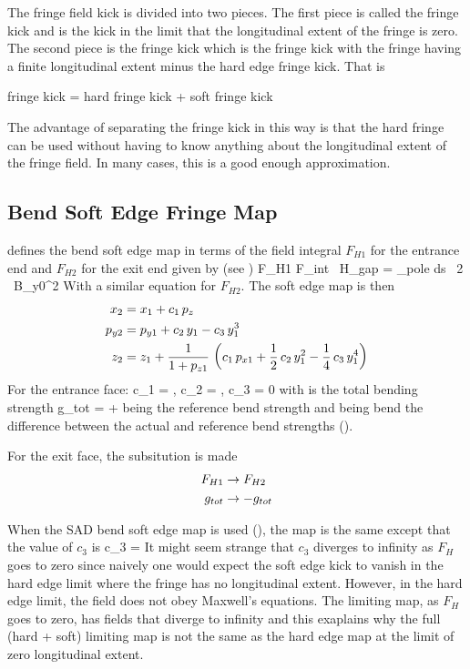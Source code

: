 The fringe field kick is divided into two pieces. 
The first piece is called the  fringe kick and is the kick in the limit
that the longitudinal extent of the fringe is zero. The second piece is the 
 fringe kick which is the fringe kick with the fringe having a finite
longitudinal extent minus the hard edge fringe kick. That is
\begin{example}
  fringe kick = hard fringe kick + soft fringe kick
\end{example}
The advantage of separating the fringe kick in this way is that the hard fringe can
be used without having to know anything about the longitudinal extent of the fringe
field. In many cases, this is a good enough approximation. 

\subsection{Bend Soft Edge Fringe Map}


\bmad defines the bend soft edge map in terms of the field integral
$F_{H1}$ for the entrance end and $F_{H2}$ for the exit end given by
(see )
\Begineq
  F_{H1} \equiv F_{int} \, H_{gap} = \int_{pole} \! \! ds \, 
  {2 \, B_{y0}^2}
\Endeq
With a similar equation for $F_{H2}$.
The soft edge map is then
\begin{align}
  x_2 &=  x_1 + c_1 \, p_z \nonumber \\
  p_{y2} &= p_{y1} + c_2 \, y_1 - c_3 \, y_1^3 \\
  z_2 &= z_1 + \frac{1}{1 + p_{z1}} \, \left( 
    c_1 \, p_{x1} + \frac{1}{2} \, c_2 \, y_1^2 -\frac{1}{4} \, c_3 \, y_1^4 \right)
    \nonumber
\end{align}
For the entrance face:
\Begineq
  c_1 = , \qquad 
  c_2 = , \qquad 
  c_3 = 0
\Endeq
with  is the total bending strength
\Begineq
  g_{tot} =  + 
\Endeq
{} being the reference bend strength and  being
bend the difference between the actual and reference bend strengths
().

For the exit face, the subsitution is made
\begin{align}
  F_{H1} &\rightarrow F_{H2} \nonumber \\
  g_{tot} &\rightarrow -g_{tot}
\end{align}

When the SAD bend soft edge map is used (), the map is
the same except that the value of $c_3$ is
\Begineq
  c_3 = 
\Endeq
It might seem strange that $c_3$ diverges to infinity as $F_H$ goes to
zero since naively one would expect the soft edge kick to vanish in
the hard edge limit where the fringe has no longitudinal
extent. However, in the hard edge limit, the field does not obey
Maxwell's equations. The limiting map, as $F_H$ goes to zero, has
fields that diverge to infinity and this exaplains why the full (hard
+ soft) limiting map is not the same as the hard edge map at the limit
of zero longitudinal extent.


